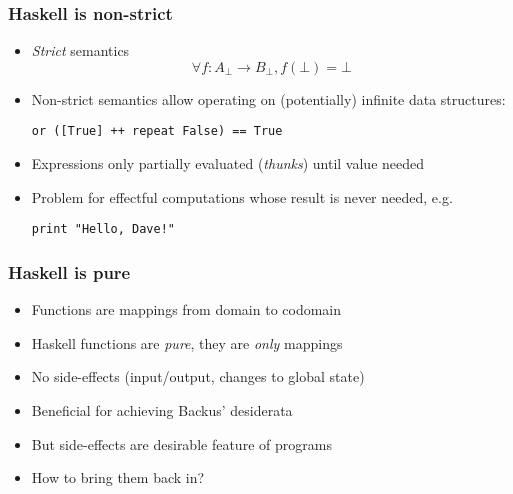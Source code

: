 \begin{frame}[fragile]
\frametitle{Haskell is non-strict}
\begin{itemize}
    \item \emph{Strict} semantics
          \[
            \forall f: A_\bot \to B_\bot, f(\bot) = \bot
          \]
    \item Non-strict semantics allow operating on (potentially) infinite data
          structures:
          \begin{center}\verb|or ([True] ++ repeat False) == True|\end{center}
    \item Expressions only partially evaluated (\emph{thunks}) until value needed
    \item Problem for effectful computations whose result is never
          needed, e.g.
          \begin{center}\verb|print "Hello, Dave!"|\end{center}
\end{itemize}
\end{frame}

\begin{frame}[fragile]
\frametitle{Haskell is pure}
\begin{itemize}
    \item Functions are mappings from domain to codomain
    \item Haskell functions are \emph{pure}, they are \emph{only} mappings
    \item No side-effects (input/output, changes to global state)
    \item Beneficial for achieving Backus' desiderata
    \item But side-effects are desirable feature of programs
    \item How to bring them back in?
\end{itemize}
\end{frame}

